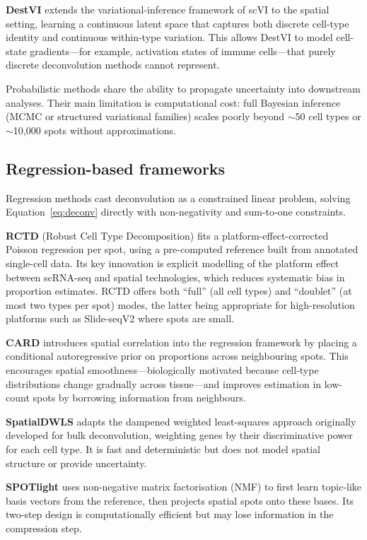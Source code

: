 \textbf{DestVI} \citep{lopez2022destvi} extends the variational-inference framework of scVI to the spatial setting, learning a continuous latent space that captures both discrete cell-type identity and continuous within-type variation. This allows DestVI to model cell-state gradients---for example, activation states of immune cells---that purely discrete deconvolution methods cannot represent.

Probabilistic methods share the ability to propagate uncertainty into downstream analyses. Their main limitation is computational cost: full Bayesian inference (MCMC or structured variational families) scales poorly beyond $\sim$50 cell types or $\sim$10{,}000 spots without approximations.

\subsection{Regression-based frameworks}

Regression methods cast deconvolution as a constrained linear problem, solving Equation~\ref{eq:deconv} directly with non-negativity and sum-to-one constraints.

\textbf{RCTD} (Robust Cell Type Decomposition) \citep{cable2022robust} fits a platform-effect-corrected Poisson regression per spot, using a pre-computed reference built from annotated single-cell data. Its key innovation is explicit modelling of the platform effect between scRNA-seq and spatial technologies, which reduces systematic bias in proportion estimates. RCTD offers both ``full'' (all cell types) and ``doublet'' (at most two types per spot) modes, the latter being appropriate for high-resolution platforms such as Slide-seqV2 where spots are small.

\textbf{CARD} \citep{ma2022card} introduces spatial correlation into the regression framework by placing a conditional autoregressive prior on proportions across neighbouring spots. This encourages spatial smoothness---biologically motivated because cell-type distributions change gradually across tissue---and improves estimation in low-count spots by borrowing information from neighbours.

\textbf{SpatialDWLS} \citep{dong2021spatialdwls} adapts the dampened weighted least-squares approach originally developed for bulk deconvolution, weighting genes by their discriminative power for each cell type. It is fast and deterministic but does not model spatial structure or provide uncertainty.

\textbf{SPOTlight} \citep{elosua2021spotlight} uses non-negative matrix factorisation (NMF) to first learn topic-like basis vectors from the reference, then projects spatial spots onto these bases. Its two-step design is computationally efficient but may lose information in the compression step.

